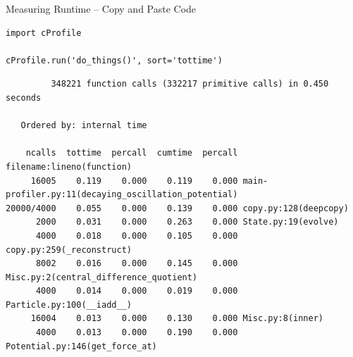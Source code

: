 \begin{frame}[fragile]{Measuring Runtime -- Copy and Paste Code}
%
\begin{codebox}
\begin{verbatim}
import cProfile

cProfile.run('do_things()', sort='tottime')
\end{verbatim}
\end{codebox}
%
\begin{cmdbox}
\begin{verbatim}
         348221 function calls (332217 primitive calls) in 0.450 seconds

   Ordered by: internal time

    ncalls  tottime  percall  cumtime  percall filename:lineno(function)
     16005    0.119    0.000    0.119    0.000 main-profiler.py:11(decaying_oscillation_potential)
20000/4000    0.055    0.000    0.139    0.000 copy.py:128(deepcopy)
      2000    0.031    0.000    0.263    0.000 State.py:19(evolve)
      4000    0.018    0.000    0.105    0.000 copy.py:259(_reconstruct)
      8002    0.016    0.000    0.145    0.000 Misc.py:2(central_difference_quotient)
      4000    0.014    0.000    0.019    0.000 Particle.py:100(__iadd__)
     16004    0.013    0.000    0.130    0.000 Misc.py:8(inner)
      4000    0.013    0.000    0.190    0.000 Potential.py:146(get_force_at)
\end{verbatim}
\end{cmdbox}
%
\end{frame}



